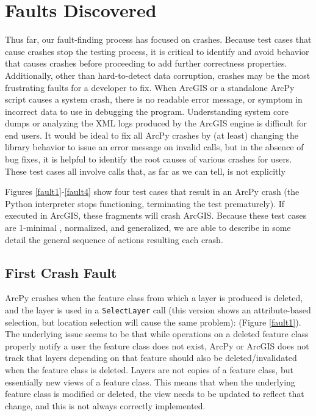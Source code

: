 \section{Faults Discovered}

Thus far, our fault-finding process has focused on crashes.  Because
test cases that cause crashes stop the testing process, it is critical
to identify and avoid behavior that causes crashes before proceeding
to add further correctness properties.  Additionally, other than
hard-to-detect data corruption, crashes may be the most frustrating
faults for a developer to fix.  When ArcGIS or a standalone ArcPy
script causes a system crash, there is no readable error message, or
symptom in incorrect data to use in debugging the program.
Understanding system core dumps or analyzing the XML logs produced by
the ArcGIS engine is difficult for end users.  It would be ideal to
fix all ArcPy crashes by (at least) changing the library behavior to
issue an error message on invalid calls, but in the absence of bug
fixes, it is helpful to identify the root causes of various crashes
for users.  These test cases all involve calls that, as far as we
can tell, is not explicitly 

Figures \ref{fault1}-\ref{fault4} show four test cases that result in
an ArcPy crash (the Python interpreter stops functioning, terminating
the test prematurely).  If executed in ArcGIS, these fragments will
crash ArcGIS.  Because these test cases are 1-minimal \cite{DD},
normalized, and generalized, we are able to describe in some detail
the general sequence of actions resulting each crash.

\subsection{First Crash Fault}

ArcPy crashes when the feature class from which a layer is produced is
deleted, and the layer is used in a {\tt SelectLayer} call (this
version shows an attribute-based selection, but location selection
will cause the same problem): (Figure \ref{fault1}).  The underlying issue seems to be that
while operations on a deleted feature class properly notify a user the
feature class does not exist, ArcPy or ArcGIS does not track that
layers depending on that feature should also be deleted/invalidated
when the feature class is deleted.  Layers are not copies
of a feature class, but essentially new views of a feature class.
This means that when the underlying feature class is modified or
deleted, the view needs to be updated to reflect that change, and this
is not always correctly implemented.

